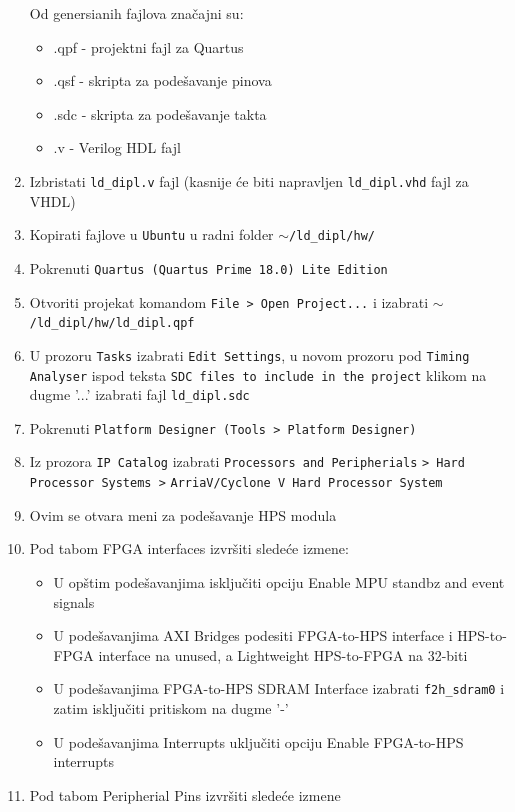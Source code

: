 \begin{enumerate}
Od genersianih fajlova značajni su:
\begin{itemize}
\item .qpf - projektni fajl za Quartus
\item .qsf - skripta za podešavanje pinova
\item .sdc - skripta za podešavanje takta
\item .v - Verilog HDL fajl
\end{itemize}
\item  Izbristati \texttt{ld\_dipl.v} fajl (kasnije će biti napravljen \texttt{ld\_dipl.vhd} fajl za VHDL)
\item  Kopirati fajlove u \texttt{Ubuntu} u radni folder \texttt{$\sim$/ld\_dipl/hw/}
\item  Pokrenuti \texttt{Quartus (Quartus Prime 18.0) Lite Edition}
\item  Otvoriti projekat komandom \texttt{File > Open Project...} i izabrati \texttt{$\sim$/ld\_dipl/hw/ld\_dipl.qpf}
\item U prozoru \texttt{Tasks} izabrati \texttt{Edit Settings}, u novom prozoru pod \texttt{Timing Analyser} ispod teksta \texttt{SDC files to include in the project} klikom na dugme '...' izabrati fajl \texttt{ld\_dipl.sdc}
\item  Pokrenuti \texttt{Platform Designer (Tools > Platform Designer)}
\item  Iz prozora \texttt{IP Catalog} izabrati \texttt{Processors and Peripherials} \texttt{> Hard Processor Systems >} \texttt{ArriaV/Cyclone V Hard Processor System}
\item  Ovim se otvara meni za podešavanje HPS modula
\item  Pod tabom FPGA interfaces izvršiti sledeće izmene:
\begin{itemize}
\item	U opštim podešavanjima isključiti opciju Enable MPU standbz and event signals
\item	U podešavanjima AXI Bridges podesiti FPGA-to-HPS interface i HPS-to-FPGA interface na unused, a Lightweight HPS-to-FPGA na 32-biti
\item	U podešavanjima FPGA-to-HPS SDRAM Interface izabrati \texttt{f2h\_sdram0} i zatim isključiti pritiskom na dugme '-'
\item	U podešavanjima Interrupts uključiti opciju Enable FPGA-to-HPS interrupts
\end{itemize}
\item  Pod tabom Peripherial Pins izvršiti sledeće izmene
\begin{itemize}

\end{itemize}
\end{enumerate}
